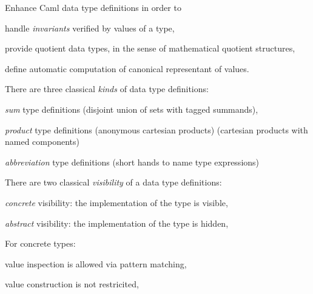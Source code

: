\def\adviheader{\relax}


Enhance Caml data type definitions in order to

\begin{citemize}
\item handle {\em invariants} verified by values of a type,

\item provide quotient data types, in the sense of mathematical quotient
  structures,

\item define automatic computation of canonical representant of values.
\end{citemize}


There are three classical {\em kinds} of data type definitions:
\begin{citemize}
\item {\em sum} type definitions
 (disjoint union of sets with tagged summands),

\item {\em product} type definitions
 (anonymous cartesian products)
 (cartesian products with named components)

\item {\em abbreviation} type definitions
 (short hands to name type expressions)
\end{citemize}


There are two classical {\em visibility} of a data type definitions:

\begin{citemize}

\item {\em concrete} visibility: the implementation of the type is visible,

\item {\em abstract} visibility: the implementation of the type is hidden,
\end{citemize}


For concrete types:

\begin{citemize}
\item value inspection is allowed via pattern matching,
\item value construction is not restricited,
\end{citemize}

